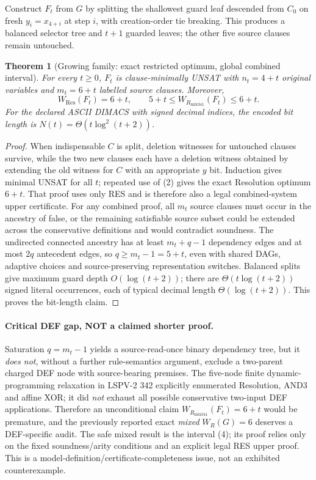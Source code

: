\documentclass[11pt]{article}
\newtheorem{theorem}{Theorem}
\begin{document}
Construct $F_t$ from $G$ by splitting the shallowest guard leaf descended from $C_0$ on fresh $y_i=x_{4+i}$ at step $i$, with creation-order tie breaking. This produces a balanced selector tree and $t+1$ guarded leaves; the other five source clauses remain untouched.

\begin{theorem}[Growing family: exact restricted optimum, global combined interval]
For every $t\ge0$, $F_t$ is clause-minimally UNSAT with
$n_t=4+t$ original variables and $m_t=6+t$ labelled source clauses. Moreover,
\[
\boxed{W_{\mathrm{Res}}(F_t)=6+t},\qquad
\boxed{5+t\le W_{R_{\mathrm{mix341}}}(F_t)\le6+t}.
\tag{4}
\]
For the declared ASCII DIMACS with signed decimal indices, the encoded bit length is $N(t)=\Theta(t\log^2(t+2))$.
\end{theorem}
\begin{proof}
When indispensable $C$ is split, deletion witnesses for untouched clauses survive, while the two new clauses each have a deletion witness obtained by extending the old witness for $C$ with an appropriate $y$ bit. Induction gives minimal UNSAT for all $t$; repeated use of (2) gives the exact Resolution optimum $6+t$. That proof uses only RES and is therefore also a legal combined-system upper certificate. For any combined proof, all $m_t$ source clauses must occur in the ancestry of false, or the remaining satisfiable source subset could be extended across the conservative definitions and would contradict soundness. The undirected connected ancestry has at least $m_t+q-1$ dependency edges and at most $2q$ antecedent edges, so $q\ge m_t-1=5+t$, even with shared DAGs, adaptive choices and source-preserving representation switches. Balanced splits give maximum guard depth $O(\log(t+2))$; there are $\Theta(t\log(t+2))$ signed literal occurrences, each of typical decimal length $\Theta(\log(t+2))$. This proves the bit-length claim.
\end{proof}

\paragraph{Critical DEF gap, NOT a claimed shorter proof.}
Saturation $q=m_t-1$ yields a source-read-once binary dependency tree, but it \emph{does not}, without a further rule-semantics argument, exclude a two-parent charged DEF node with source-bearing premises. The five-node finite dynamic-programming relaxation in LSPV-2 342 explicitly enumerated Resolution, AND3 and affine XOR; it did \emph{not} exhaust all possible conservative two-input DEF applications. Therefore an unconditional claim $W_{R_{\mathrm{mix341}}}(F_t)=6+t$ would be premature, and the previously reported exact \emph{mixed} $W_R(G)=6$ deserves a DEF-specific audit. The safe mixed result is the interval (4); its proof relies only on the fixed soundness/arity conditions and an explicit legal RES upper proof. This is a model-definition/certificate-completeness issue, not an exhibited counterexample.
\end{document}
